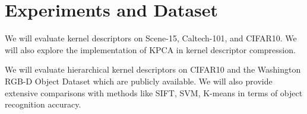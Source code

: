 \documentclass[10pt,twocolumn,letterpaper]{article}
\begin{document}


\section{Experiments and Dataset}
We will evaluate kernel descriptors on Scene-15, Caltech-101, and CIFAR10. We will also explore the implementation of KPCA in kernel descriptor compression.

We will evaluate hierarchical kernel descriptors on CIFAR10 and the Washington RGB-D Object Dataset\cite{lai_icra11a} which are publicly available. We will also provide extensive comparisons with methods like SIFT, SVM, K-means in terms of object recognition accuracy.  
\end{document}
